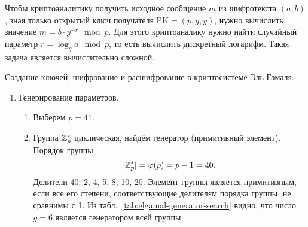Чтобы криптоаналитику получить исходное сообщение $m$ из шифротекста $(a, b)$, зная только открытый ключ получателя $\text{PK} = (p, g, y)$, нужно вычислить значение $m = b \cdot y^{-r} \mod p$. Для этого криптоаналику нужно найти случайный параметр $r = \log_g a \mod p$, то есть вычислить дискретный логарифм. Такая задача является вычислительно сложной.

\example Создание ключей, шифрование и расшифрование в криптосистеме Эль-Гамаля.

\begin{enumerate}
    \item Генерирование параметров.
        \begin{enumerate}
            \item Выберем $p=41$.
            \item Группа $\mathbb{Z}_p^*$ циклическая, найдём генератор (примитивный элемент). Порядок группы
                \[ |\mathbb{Z}_p^*| = \varphi(p) = p-1 = 40. \]
                Делители 40: 2, 4, 5, 8, 10, 20. Элемент группы является примитивным, если все его степени, соответствующие делителям порядка группы, не сравнимы с 1. Из табл.~\ref{tab:elgamal-generator-search} видно, что число $g = 6$ является генератором всей группы.
                \begin{table}[!ht]
                    \centering
                    \caption{Поиск генератора в циклической группе $\Z_{41}^*$. Элемент 6 -- генератор\label{tab:elgamal-generator-search}}
                \end{table}

\end{enumerate}
\end{enumerate}
